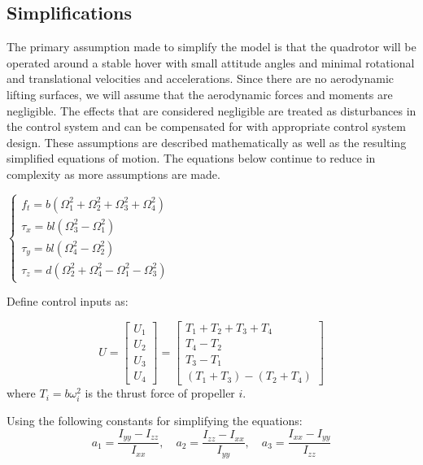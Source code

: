 \subsection{Simplifications}
\label{ssec:frontend}

The primary assumption made to simplify the model is that the quadrotor will be operated around a stable hover with small attitude angles and minimal rotational and translational velocities and accelerations.
Since there are no aerodynamic lifting surfaces, we will assume that the aerodynamic forces and moments are negligible.
The effects that are considered negligible are treated as disturbances in the control system and can be compensated for with appropriate control system design.
These assumptions are described mathematically as well as the resulting simplified equations of motion.
The equations below continue to reduce in complexity as more assumptions are made.

$
\left\{
\begin{array}{l}
  f_{t}=b\left(\Omega_{1}^{2}+\Omega_{2}^{2}+\Omega_{3}^{2}+\Omega_{4}^{2}\right) \\
  \tau_{x}=b l\left(\Omega_{3}^{2}-\Omega_{1}^{2}\right) \\
  \tau_{y}=b l\left(\Omega_{4}^{2}-\Omega_{2}^{2}\right) \\
  \tau_{z}=d\left(\Omega_{2}^{2}+\Omega_{4}^{2}-\Omega_{1}^{2}-\Omega_{3}^{2}\right)
\end{array}
\right.
$

Define control inputs as:

$$U=\left[ \begin{array}{l}{U_{1}} \\ {U_{2}} \\ {U_{3}} \\ {U_{4}}\end{array}\right]=\left[ \begin{array}{c}{T_{1}+T_{2}+T_{3}+T_{4}} \\ {T_{4}-T_{2}} \\ {T_{3}-T_{1}} \\ {\left(T_{1}+T_{3}\right)-\left(T_{2}+T_{4}\right)}\end{array}\right]$$
where $T_i=b\omega_{i}^2$ is the thrust force of propeller $i$.

  Using the following constants for simplifying the equations:
$$a_{1}=\frac{I_{y y}-I_{z z}}{I_{x x}}, \quad a_{2}=\frac{I_{z z}-I_{x x}}{I_{y y}}, \quad a_{3}=\frac{I_{x x}-I_{y y}}{I_{z z}}$$

